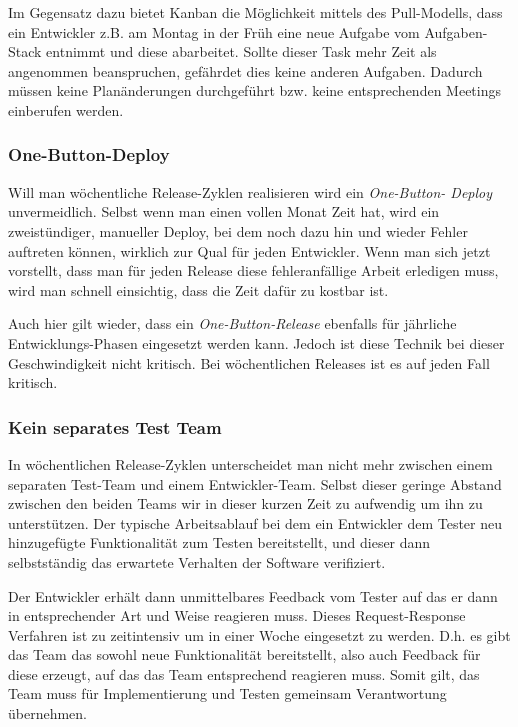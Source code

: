 Im Gegensatz dazu bietet Kanban die Möglichkeit mittels des Pull-Modells, dass
ein Entwickler z.B. am Montag in der Früh eine neue Aufgabe vom Aufgaben-Stack
entnimmt und diese abarbeitet. Sollte dieser Task mehr Zeit als angenommen
beanspruchen, gefährdet dies keine anderen Aufgaben. Dadurch müssen keine
Planänderungen durchgeführt bzw. keine entsprechenden Meetings einberufen
werden.

\subsubsection{One-Button-Deploy}

Will man wöchentliche Release-Zyklen realisieren wird ein \emph{One-Button-
Deploy} unvermeidlich. Selbst wenn man einen vollen Monat Zeit hat, wird ein
zweistündiger, manueller Deploy, bei dem noch dazu hin und wieder Fehler
auftreten können, wirklich zur Qual für jeden Entwickler. Wenn man sich jetzt
vorstellt, dass man für jeden Release diese fehleranfällige Arbeit erledigen
muss, wird man schnell einsichtig, dass die Zeit dafür zu kostbar ist.

Auch hier gilt wieder, dass ein \emph{One-Button-Release} ebenfalls für
jährliche Entwicklungs-Phasen eingesetzt werden kann. Jedoch ist diese Technik
bei dieser Geschwindigkeit nicht kritisch. Bei wöchentlichen Releases ist es
auf jeden Fall kritisch.

\subsubsection{Kein separates Test Team}
In wöchentlichen Release-Zyklen unterscheidet man nicht mehr zwischen einem
separaten Test-Team und einem Entwickler-Team. Selbst dieser geringe Abstand
zwischen den beiden Teams wir in dieser kurzen Zeit zu aufwendig um ihn zu
unterstützen. Der typische Arbeitsablauf bei dem ein Entwickler dem Tester neu
hinzugefügte Funktionalität zum Testen bereitstellt, und dieser dann
selbstständig das erwartete Verhalten der Software verifiziert.

Der Entwickler erhält dann unmittelbares Feedback vom Tester auf das er dann
in entsprechender Art und Weise reagieren muss. Dieses Request-Response
Verfahren ist zu zeitintensiv um in einer Woche eingesetzt zu werden. D.h. es
gibt das Team das sowohl neue Funktionalität bereitstellt, also auch Feedback
für diese erzeugt, auf das das Team entsprechend reagieren muss. Somit gilt,
das Team muss für Implementierung und Testen gemeinsam Verantwortung
übernehmen.

